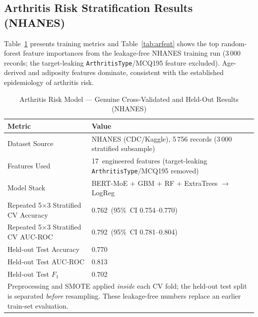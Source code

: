 \documentclass[AMA,STIX1COL,]{WileyNJD-v2}
\begin{document}
\subsection{Arthritis Risk Stratification Results (NHANES)}

Table~\ref{tab:arthr} presents training metrics and
Table~\ref{tab:arfeat} shows the top random-forest feature
importances from the leakage-free NHANES training run (3\,000
records; the target-leaking \texttt{ArthritisType}/MCQ195 feature
excluded). Age-derived and adiposity features dominate, consistent
with the established epidemiology of arthritis risk.

\begin{table}[!t]
\caption{Arthritis Risk Model --- Genuine Cross-Validated and Held-Out Results (NHANES)}
\label{tab:arthr}
\centering
\renewcommand{\arraystretch}{1.1}
\begin{tabular}{lp{3.8cm}}
\toprule
\textbf{Metric} & \textbf{Value}\\
\midrule
Dataset Source          & NHANES (CDC/Kaggle), 5\,756 records (3\,000 stratified subsample)\\
Features Used           & 17~engineered features (target-leaking \texttt{ArthritisType}/MCQ195 removed)\\
Model Stack             & BERT-MoE $+$ GBM $+$ RF $+$ ExtraTrees $\to$ LogReg\\
\midrule
Repeated 5$\times$3 Stratified CV Accuracy & 0.762~(95\%~CI 0.754--0.770)\\
Repeated 5$\times$3 Stratified CV AUC-ROC  & 0.792~(95\%~CI 0.781--0.804)\\
Held-out Test Accuracy  & 0.770\\
Held-out Test AUC-ROC   & 0.813\\
Held-out Test $F_1$     & 0.702\\
\midrule
\multicolumn{2}{p{7.4cm}}{\footnotesize Preprocessing and SMOTE applied \emph{inside} each CV fold; the held-out test split is separated \emph{before} resampling. These leakage-free numbers replace an earlier train-set evaluation.}\\
\bottomrule
\end{tabular}
\end{table}
\end{document}
